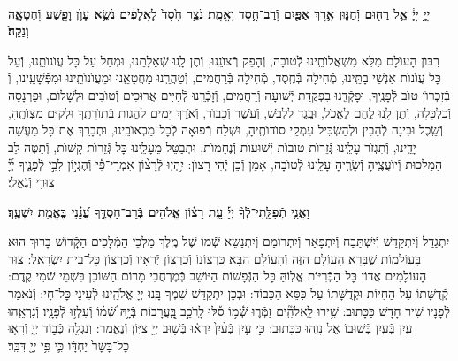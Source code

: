 \documentclass[twoside, openany, parskip=half, 11pt]{book}
\begin{document}
\begin{sometimes}

\\
 \textbf{יְיָ֣ יְיָ֔ אֵ֥ל רַח֖וּם וְֿחַנּ֑וּן אֶ֥רֶךְ אַפַּ֖יִם וְֿרַב־חֶ֥סֶד וֶאֱמֶֽת׃ נֹצֵ֥ר חֶ֙סֶד֙ לָאֲלָפִ֔ים נֹשֵׂ֥א עָוֺ֛ן וָפֶ֖שַׁע וְֿחַטָּאָ֑ה וְֿנַקֵּה֙׃}

רִבּוֺן הָעוׂלָם מַלֵּא מִשְׁאֲלוׂתֵֽינוּ לְֿטוׂבָה, וְֿהָפֵק רְֿצוׂנֵֽנוּ, וְֿתֶן לָֽנוּ שְֿׁאֵלָתֵֽנוּ, וּמְחַל עַל כָּל עֲוׂנוׂתֵֽנוּ, וְֿעַל כָּל עֲוׂנוׂת אַנְשֵׁי בָתֵּֽינוּ, מְֿחִילָה בְּֿחֶֽסֶד, מְֿחִילָה בְּֿרַחֲמִים, וְֿטַהֲרֵֽנוּ מֵחֲטָאֵֽנוּ וּמֵעֲוׂנוׂתֵֽינוּ וּמִפְּֿשָׁעֵֽינוּ, וְֿ בְּֿזִכְרוׂן טוׂב לְֿפָנֶֽיךָ, וּפָקְֿדֵֽנוּ בִּפְקֻדַּת יְֿשׁוּעָה וְֿרַחֲמִים, וְֿזָכְֿרֵֽנוּ לְֿחַיִּים אֲרוּכִים וְֿטוׂבִים וּלְשָׁלוׂם, וּפַרְנָסָה וְֿכַלְכָּלָה, וְֿתֶן לָֽנוּ לֶֽחֶם לֶאֱכׂל, וּבֶֽגֶד לִלְבּׂשׁ, וְֿעׂשֶׁר וְֿכָבוׂד, וְֿאׂרֶךְ יָמִים לַהֲגוׂת בְּֿתוׂרָתֶֽךָ וּלְקַיֵּם מִצְוׂתֶֽהָ, וְֿשֵֽׂכֶל וּבִינָה לְֿהָבִין וּלְהַשְׂכִּיל עִמְקֵי סוׂדוׂתֶֽיהָ, וּשְׁלַח רְֿפוּאָה לְֿכׇל־מַכְאוׂבֵֽינוּ, וּתְבָרֵךְ אֶת־כָּל מַעֲשֵׁה יָדֵֽינוּ, וְֿתִגְזׂר עָלֵֽינוּ גְּֿזֵרוׂת טוׂבוׂת יְֿשׁוּעוׂת וְֿנֶחָמוׂת, וּתְבַטֵּל מֵעָלֵֽינוּ כָּל גְּֿזֵרוׂת קָשׁוׂת, וְֿתַטֶּה לֵב הַמַּלְכוּת וְֿיוׂעֲצֶֽיהָ וְֿשָׂרֶֽיהָ עָלֵֽינוּ לְֿטוׂבָה, אָמֵן וְֿכֵן יְֿהִי רָצוׂן:
%
 יִ֥הְיֽוּ לְֿרָצ֨וֹן אִמְרֵי־פִ֡י וְֿהֶגְי֣וֹן לִבִּ֣י לְֿפָנֶ֑יךָ יְ֜יָ֗ צוּרִ֥י וְֿגֹֽאֲלִֽי׃


\textbf{וַאֲנִ֤י תְֿפִלָּֽתִי־לְֿֿךָ֨ יְיָ֡ עֵ֤ת רָצ֗וֹן אֱלֹהִ֥ים בְּֿרָב־חַסְדֶּ֑ךָ עֲ֝נֵ֗נִי בֶּאֱמֶ֥ת יִשְׁעֶֽךָ׃}

\end{sometimes}

\gadlu

\label{al hakol}
יִתְגַּדַּל וְֿיִתְקַדַּשׁ וְֿיִשְׁתַּבַּח וְֿיִתְפָּאַר וְֿיִתְרוֹמַם וְֿיִתְנַשֵּׂא שְֿׁמוֹ שֶׁל מֶֽלֶךְ מַלְכֵי הַמְּֿלָכִים הַקְָּֿדוֹשׁ בָּרוּךְ הוּא בָּעוֹלָמוֹת שֶׁבָּרָא הָעוֹלָם הַזֶּה וְֿהָעוֹלָם הַבָּא כִּרְצוֹנוֹ וְֿכִרְצוֹן יְֿרֵאָיו וְֿכִרְצוֹן כׇּל־בֵּית יִשְׂרָאֵל: צוּר הָעוֹלָמִים אֲדוֹן כׇּל־הַבְּֿרִיּוֹת אֱלֽוֹהַּ כׇּל־הַנְּֿפָשׁוֹת הַיּוֹשֵׁב בְּֿמֶרְחֲבֵי מָרוֹם הַשּׁוֹכֵן בִּשְׁמֵי שְֿׁמֵי קֶֽדֶם: קְֿדֻשָּׁתוֹ עַל הַחַיּוֹת וּקְדֻשָּׁתוֹ עַל כִּסֵּא הַכָּבוֹד: וּבְכֵן יִתְקַדַּשׁ שִׁמְךָ בָּֽנוּ יְיָ אֱלֹהֵֽינוּ לְֿעֵינֵי כׇּל־חָי: וְֿנֹאמַר לְֿפָנָיו שִׁיר חָדָשׁ כַּכָּתוּב:
 שִׁ֥ירוּ לֵֽאלֹהִֽ֘ים זַמְּֿר֢וּ שְֿׁ֫מ֥וֹ סֹ֡לּוּ לָֽרֹכֵ֣ב בָּֽ֭עֲרָבוֹת בְּֿיָ֥הּ שְֿׁ֝מ֗וֹ וְֿעִלְז֥וּ לְֿפָנָֽיו׃ וְֿנִרְאֵֽהוּ עַֽיִן בְּֿעַֽיִן בְּֿשׁוּבוֹ אֶל נָוֵֽהוּ כַּכָּתוּב:
%
 כִּ֣י עַ֤יִן בְּֿעַ֨יִן֙ יִרְא֔וּ בְּֿשׁ֥וּב יְיָ֖ צִיּֽוֹן׃ וְֿנֶאֱמַר:
וְנִגְלָ֖ה כְּֿב֣וֹד יְיָ֑ וְֿרָא֤וּ כׇל־בָּשָׂר֙ יַחְדָּ֔ו כִּ֛י פִּ֥י יְיָ֖ דִּבֵּֽר׃
\end{document}
